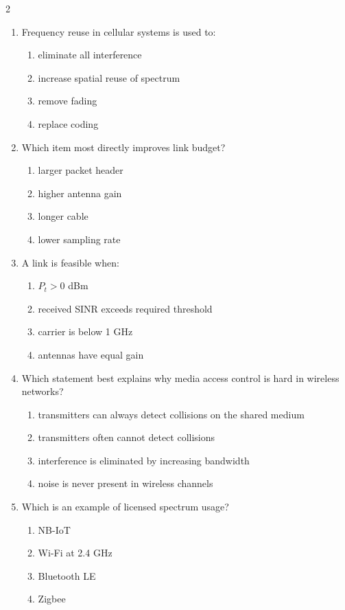 \begin{multicols}{2}
\begin{enumerate}[leftmargin=*, itemsep=0.4em]
\item Frequency reuse in cellular systems is used to:
\begin{enumerate}[label=\alph*)]
\item eliminate all interference
\item increase spatial reuse of spectrum
\item remove fading
\item replace coding
\end{enumerate}

\item Which item most directly improves link budget?
\begin{enumerate}[label=\alph*)]
\item larger packet header
\item higher antenna gain
\item longer cable
\item lower sampling rate
\end{enumerate}

\item A link is feasible when:
\begin{enumerate}[label=\alph*)]
\item $P_t > 0$ dBm
\item received SINR exceeds required threshold
\item carrier is below 1 GHz
\item antennas have equal gain
\end{enumerate}

\item Which statement best explains why media access control is hard in wireless networks?
\begin{enumerate}[label=\alph*)]
\item transmitters can always detect collisions on the shared medium
\item transmitters often cannot detect collisions
\item interference is eliminated by increasing bandwidth
\item noise is never present in wireless channels
\end{enumerate}

\item Which is an example of licensed spectrum usage?
\begin{enumerate}[label=\alph*)]
\item NB-IoT
\item Wi-Fi at 2.4 GHz
\item Bluetooth LE
\item Zigbee
\end{enumerate}


\end{enumerate}
\end{multicols}
